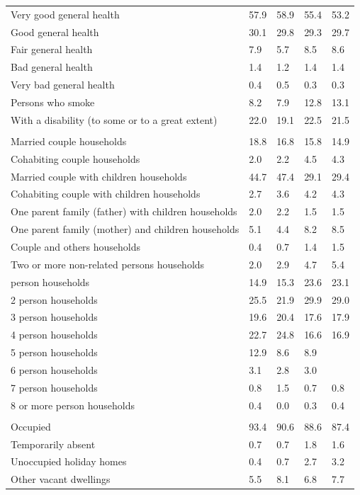 \documentclass{article}
\begin{document}
\begin{table}[h]
\begin{tabular}{KTTTT}
    \hline
Very good general health & 57.9& 58.9&55.4& 53.2\\
Good general health & 30.1& 29.8& 29.3& 29.7\\
Fair general health & 7.9& 5.7&8.5& 8.6\\
Bad general health & 1.4& 1.2&1.4& 1.4\\
Very bad general health & 0.4& 0.5&0.3& 0.3\\
    \hline
Persons who smoke &  8.2&  7.9&12.8& 13.1\\
    \hline
With a disability (to some or to a great extent) & 22.0& 19.1&22.5& 21.5\\
\hline
    \\ 
    \hline
Married couple households & 18.8& 16.8& 15.8& 14.9\\
Cohabiting couple households & 2.0& 2.2& 4.5& 4.3\\
Married couple with children households & 44.7& 47.4& 29.1& 29.4\\
Cohabiting couple with children households & 2.7& 3.6& 4.2& 4.3\\
One parent family (father) with  children households & 2.0& 2.2& 1.5& 1.5\\
One parent family (mother) and children households & 5.1& 4.4& 8.2& 8.5\\
Couple and others households  & 0.4& 0.7& 1.4& 1.5\\
Two or more non-related persons households & 2.0& 2.9& 4.7& 5.4\\
     person households & 14.9& 15.3& 23.6& 23.1\\
2 person households & 25.5& 21.9& 29.9& 29.0\\
3 person households & 19.6& 20.4& 17.6& 17.9\\
4 person households & 22.7& 24.8& 16.6& 16.9\\
5 person households & 12.9&  8.6&  8.9\\
6 person households & 3.1& 2.8& 3.0\\
7 person households & 0.8& 1.5& 0.7& 0.8\\
8 or more person households & 0.4& 0.0& 0.3& 0.4\\
\hline
    \\ 
    \hline
Occupied & 93.4& 90.6& 88.6& 87.4\\
Temporarily absent & 0.7& 0.7& 1.8& 1.6\\
Unoccupied holiday homes & 0.4& 0.7& 2.7& 3.2\\
Other vacant dwellings & 5.5& 8.1& 6.8& 7.7\\
\hline
\end{tabular}
\end{table}
\end{document}
